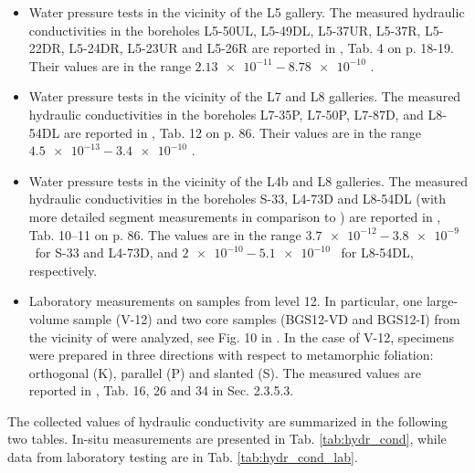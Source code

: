 \begin{itemize}
\item Water pressure tests in the vicinity of the L5 gallery. The measured hydraulic conductivities in the boreholes L5-50UL, L5-49DL, L5-37UR, L5-37R, L5-22DR, L5-24DR, L5-23UR and L5-26R are reported in \cite{tz_monitoring}, Tab. 4 on p. 18-19. Their values are in the range $\num{2.13e-11}-\num{8.78e-10}$ \mps.

\item Water pressure tests in the vicinity of the L7 and L8 galleries. The measured hydraulic conductivities in the boreholes L7-35P, L7-50P, L7-87D, and L8-54DL are reported in \cite{tz_char_2}, Tab. 12 on p. 86. Their values are in the range $\num{4.5e-13}-\num{3.4e-10}$ \mps.

\item Water pressure tests in the vicinity of the L4b and L8 galleries. The measured hydraulic conductivities in the boreholes S-33, L4-73D and L8-54DL (with more detailed segment measurements in comparison to \cite{tz_char_2}) are reported in \cite{tz_char_3}, Tab. 10--11 on p. 86. The values are in the range $\num{3.7e-12}-\num{3.8e-9}$ \mps ~for S-33 and L4-73D, and $\num{2e-10}-\num{5.1e-10}$ \mps ~for L8-54DL, respectively.

\item Laboratory measurements on samples from level 12. In particular, one large-volume sample (V-12) and two core samples (BGS12-VD and BGS12-I) from the vicinity of \URFBI were analyzed, see Fig. 10 in \cite{tz_hh}.
In the case of V-12, specimens were prepared in three directions with respect to metamorphic foliation: orthogonal (K), parallel (P) and slanted (S).
The measured values are reported in \cite{tz_hh}, Tab. 16, 26 and 34 in Sec. 2.3.5.3.
\end{itemize}

The collected values of hydraulic conductivity are summarized in the following two tables.
In-situ measurements are presented in Tab. \ref{tab:hydr_cond}, while data from laboratory testing are in Tab. \ref{tab:hydr_cond_lab}.


